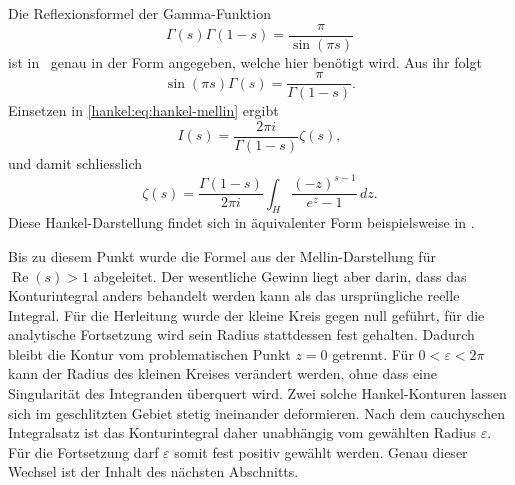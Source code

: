 Die Reflexionsformel der Gamma-Funktion
\begin{equation}
\Gamma(s)\Gamma(1-s)
=
\frac{\pi}{\sin(\pi s)}
\label{hankel:eq:reflexionsformel}
\end{equation}
ist in~\cite{hankel:dlmf} genau in der Form angegeben, welche hier benötigt wird. 
Aus ihr folgt
\begin{equation}
\sin(\pi s)\Gamma(s)
=
\frac{\pi}{\Gamma(1-s)}.
\label{hankel:eq:reflexion-umgestellt}
\end{equation}
Einsetzen in \eqref{hankel:eq:hankel-mellin} ergibt
\begin{equation}
I(s)
=
\frac{2\pi i}{\Gamma(1-s)}\zeta(s),
\label{hankel:eq:hankel-vor-endformel}
\end{equation}
und damit schliesslich
\begin{equation}
\boxed{
\zeta(s)
=
\frac{\Gamma(1-s)}{2\pi i}
\int_H
\frac{(-z)^{s-1}}{e^z-1}
\,dz.
}
\label{hankel:eq:hankel-darstellung}
\end{equation}
Diese Hankel-Darstellung findet sich in äquivalenter Form
beispielsweise in \cite{hankel:dlmf}.

Bis zu diesem Punkt wurde die Formel aus der Mellin-Darstellung für $\operatorname{Re}(s)>1$ abgeleitet. 
Der wesentliche Gewinn liegt aber darin, dass das Konturintegral anders behandelt werden kann als das ursprüngliche reelle Integral. 
Für die Herleitung wurde der kleine Kreis gegen null
geführt, für die analytische Fortsetzung wird sein Radius stattdessen fest gehalten. 
Dadurch bleibt die Kontur vom problematischen Punkt $z=0$
getrennt. 
Für $0<\varepsilon<2\pi$ kann der Radius des kleinen Kreises verändert werden, ohne dass eine Singularität des Integranden überquert wird. 
Zwei solche Hankel-Konturen lassen sich im geschlitzten Gebiet stetig ineinander deformieren. 
Nach dem cauchyschen Integralsatz ist das Konturintegral daher unabhängig vom gewählten Radius $\varepsilon$. 
%
Für die Fortsetzung darf $\varepsilon$ somit fest positiv gewählt werden.
Genau dieser Wechsel ist der Inhalt des nächsten Abschnitts.
